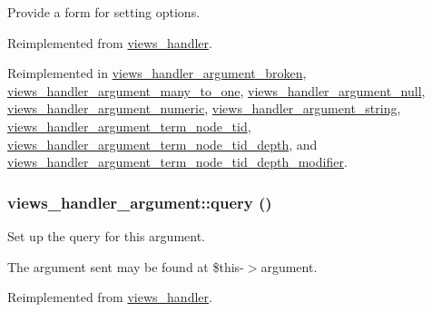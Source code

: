 Provide a form for setting options. 

Reimplemented from \hyperlink{classviews__handler_a41fcf16b177eb03e35facbae6320f74}{views\_\-handler}.

Reimplemented in \hyperlink{classviews__handler__argument__broken_dc6789177dec1350859832bc7b242454}{views\_\-handler\_\-argument\_\-broken}, \hyperlink{classviews__handler__argument__many__to__one_dd3ed7d59f17d79f48ef8f47e049cb92}{views\_\-handler\_\-argument\_\-many\_\-to\_\-one}, \hyperlink{classviews__handler__argument__null_414f383de12d08f6e1e5eccb572cf9c8}{views\_\-handler\_\-argument\_\-null}, \hyperlink{classviews__handler__argument__numeric_b30359963ec4962258bb8db3b6a870c4}{views\_\-handler\_\-argument\_\-numeric}, \hyperlink{classviews__handler__argument__string_b96e2120f4f4458921f817b343d11ef0}{views\_\-handler\_\-argument\_\-string}, \hyperlink{classviews__handler__argument__term__node__tid_f00552a1378333434154989c051d0e98}{views\_\-handler\_\-argument\_\-term\_\-node\_\-tid}, \hyperlink{classviews__handler__argument__term__node__tid__depth_db15b091303182e330a162d384676e50}{views\_\-handler\_\-argument\_\-term\_\-node\_\-tid\_\-depth}, and \hyperlink{classviews__handler__argument__term__node__tid__depth__modifier_a4796e763923377f41dbf9bf415d96e8}{views\_\-handler\_\-argument\_\-term\_\-node\_\-tid\_\-depth\_\-modifier}.\hypertarget{classviews__handler__argument_c4b0ce6704a10f515b2aea2f9e790994}{
\subsubsection[{query}]{\setlength{\rightskip}{0pt plus 5cm}views\_\-handler\_\-argument::query ()}}
\label{classviews__handler__argument_c4b0ce6704a10f515b2aea2f9e790994}


Set up the query for this argument.

The argument sent may be found at \$this-$>$argument. 

Reimplemented from \hyperlink{classviews__handler_91e22c95696d9fdb9ed753a10d42a21d}{views\_\-handler}.

